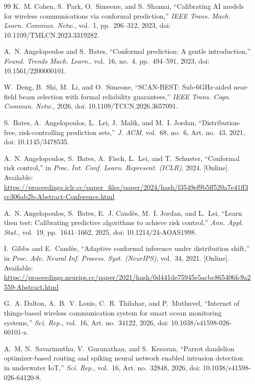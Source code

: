 \begin{thebibliography}{99}
 K.~M. Cohen, S.~Park, O.~Simeone, and S.~Shamai, ``Calibrating AI models for wireless communications via conformal prediction,'' \emph{IEEE Trans. Mach. Learn. Commun. Netw.}, vol.~1, pp.~296--312, 2023, doi: 10.1109/TMLCN.2023.3319282.

 A.~N. Angelopoulos and S.~Bates, ``Conformal prediction: A gentle introduction,'' \emph{Found. Trends Mach. Learn.}, vol.~16, no.~4, pp.~494--591, 2023, doi: 10.1561/2200000101.

 W.~Deng, B.~Shi, M.~Li, and O.~Simeone, ``SCAN-BEST: Sub-6GHz-aided near-field beam selection with formal reliability guarantees,'' \emph{IEEE Trans. Cogn. Commun. Netw.}, 2026, doi: 10.1109/TCCN.2026.3657091.

 S.~Bates, A.~Angelopoulos, L.~Lei, J.~Malik, and M.~I. Jordan, ``Distribution-free, risk-controlling prediction sets,'' \emph{J. ACM}, vol.~68, no.~6, Art. no.~43, 2021, doi: 10.1145/3478535.

 A.~N. Angelopoulos, S.~Bates, A.~Fisch, L.~Lei, and T.~Schuster, ``Conformal risk control,'' in \emph{Proc. Int. Conf. Learn. Represent. (ICLR)}, 2024. [Online]. Available: \url{https://proceedings.iclr.cc/paper_files/paper/2024/hash/f3549ef9b5ff520a7e41ff3cc306ab2b-Abstract-Conference.html}

 A.~N. Angelopoulos, S.~Bates, E.~J. Cand\`es, M.~I. Jordan, and L.~Lei, ``Learn then test: Calibrating predictive algorithms to achieve risk control,'' \emph{Ann. Appl. Stat.}, vol.~19, pp.~1641--1662, 2025, doi: 10.1214/24-AOAS1998.

 I.~Gibbs and E.~Cand\`es, ``Adaptive conformal inference under distribution shift,'' in \emph{Proc. Adv. Neural Inf. Process. Syst. (NeurIPS)}, vol.~34, 2021. [Online]. Available: \url{https://proceedings.neurips.cc/paper/2021/hash/0d441de75945e5acbc865406fc9a2559-Abstract.html}

 G.~A. Dalton, A.~B.~V. Louis, C.~R. Thilahar, and P.~Muthuvel, ``Internet of things-based wireless communication system for smart ocean monitoring systems,'' \emph{Sci. Rep.}, vol.~16, Art. no.~34122, 2026, doi: 10.1038/s41598-026-60101-z.

 A.~M, N.~Savarimuthu, V.~Gurunathan, and S.~Kesavan, ``Parrot dandelion optimizer-based routing and spiking neural network enabled intrusion detection in underwater IoT,'' \emph{Sci. Rep.}, vol.~16, Art. no.~32848, 2026, doi: 10.1038/s41598-026-64120-8.


\end{thebibliography}
